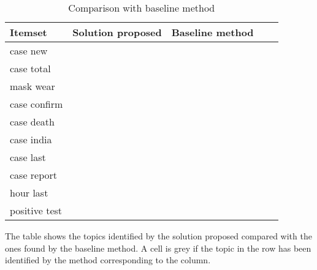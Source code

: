 
\begin{table}
    \centering
    \caption{Comparison with baseline method}
    \label{tab:bl}
    \begin{tabular}{>{\raggedright}p{}>{\raggedright}p{}p{}p{}p{}}
        \toprule
            Itemset
& Solution proposed  & Baseline method   \\          
        \midrule
        case new & \checkC{} & \checkC{} \\
                case total & \checkC{} & \checkC{} \\
                mask wear & \checkC{} & \checkC{} \\
                case confirm & \checkC{} &        {} \\
                case death & \checkC{} &        {} \\
                case india & \checkC{} &        {} \\
                case last & \checkC{} &        {} \\
                case report & \checkC{} &        {} \\
                hour last & \checkC{} &        {} \\
                positive test & \checkC{} &        {} \\
                
    \bottomrule
    \end{tabular}
    
        \begin{flushleft}
            The table shows the topics identified by the solution proposed compared 
            with the ones found by the baseline method. 
            A cell is grey if the topic in the row has been identified by the method corresponding to the column.  
        \end{flushleft}
        
\end{table}

